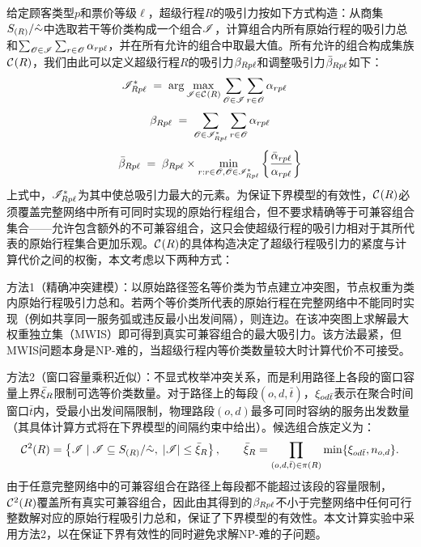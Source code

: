 给定顾客类型$p$和票价等级$\ell$，超级行程$R$的吸引力按如下方式构造：从商集$\eqClassByPathSig_{(R)} /\eqRelByOrigPath$中选取若干等价类构成一个组合$\itinCombSet$，计算组合内所有原始行程的吸引力总和$\sum_{\eqClassByOrigPath\in\itinCombSet}\sum_{r\in\eqClassByOrigPath}\attr_{rp\ell}$，并在所有允许的组合中取最大值。所有允许的组合构成集族$\compatSet{R}$，我们由此可以定义超级行程$R$的吸引力$\attrSuper_{Rp\ell}$和调整吸引力$\adjAttrSuper_{Rp\ell}$如下：
\begin{equation*}
    \begin{aligned}
        \maxAttrCombSet_{Rp\ell}
        & \;=\;
        \arg\max_{\itinCombSet \in \compatSet{R}}
        \sum_{\mathscr{O} \in \itinCombSet} \sum_{r\in \mathscr{O}} \attr_{rp\ell}
    \end{aligned}
\end{equation*}
\begin{equation}
\attrSuper_{Rp\ell}
\;=\;
\sum_{\mathscr{O} \in \maxAttrCombSet_{Rp\ell}} \sum_{r\in \mathscr{O}} \attr_{rp\ell}
\label{def:relax.attrSuper}
\end{equation}
\begin{equation}
\adjAttrSuper_{Rp\ell}
\;=\;
\attrSuper_{Rp\ell} \times \min_{r: r\in\mathscr{O}, \mathscr{O} \in \maxAttrCombSet_{Rp\ell}} \left\{\frac{\adjAttr_{rp\ell}}{\attr_{rp\ell}}\right\}
\label{def:relax.shadowAttrSuper}
\end{equation}
上式中，$\maxAttrCombSet_{Rp\ell}$为其中使总吸引力最大的元素。为保证下界模型的有效性，$\compatSet{R}$必须覆盖完整网络中所有可同时实现的原始行程组合，但不要求精确等于可兼容组合集合——允许包含额外的不可兼容组合，这只会使超级行程的吸引力相对于其所代表的原始行程集合更加乐观。$\compatSet{R}$的具体构造决定了超级行程吸引力的紧度与计算代价之间的权衡，本文考虑以下两种方式：

方法1（精确冲突建模）：以原始路径签名等价类为节点建立冲突图，节点权重为类内原始行程吸引力总和。若两个等价类所代表的原始行程在完整网络中不能同时实现（例如共享同一服务弧或违反最小出发间隔），则连边。在该冲突图上求解最大权重独立集（MWIS）即可得到真实可兼容组合的最大吸引力。该方法最紧，但MWIS问题本身是NP-难的，当超级行程内等价类数量较大时计算代价不可接受。

方法2（窗口容量乘积近似）：不显式枚举冲突关系，而是利用路径上各段的窗口容量上界$\combLimit_R$限制可选等价类数量。对于路径上的每段$(o,d,\bar{t})$，$\departLimit_{od\bar{t}}$表示在聚合时间窗口$\bar{t}$内，受最小出发间隔限制，物理路段$(o,d)$最多可同时容纳的服务出发数量（其具体计算方式将在下界模型的间隔约束中给出）。候选组合族定义为：
\[
    \compatSet[2]{R} = \left\{\itinCombSet \mid \itinCombSet \subseteq \eqClassByPathSig_{(R)} /\eqRelByOrigPath,\; |\itinCombSet| \le \combLimit_R\right\},
    \qquad
    \combLimit_R = \prod_{(o,d,\bar{t}) \in \pathSig{R}} \min\{\departLimit_{od\bar{t}}, \freq_{o,d}\}.
\]
由于任意完整网络中的可兼容组合在路径上每段都不能超过该段的容量限制，$\compatSet[2]{R}$覆盖所有真实可兼容组合，因此由其得到的$\attrSuper_{Rp\ell}$不小于完整网络中任何可行整数解对应的原始行程吸引力总和，保证了下界模型的有效性。本文计算实验中采用方法2，以在保证下界有效性的同时避免求解NP-难的子问题。

